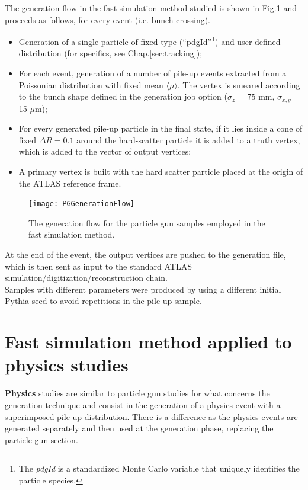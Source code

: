\documentclass[a4paper,twoside,12pt]{book}
\begin{document}
The generation flow in the fast simulation method studied is shown in Fig.\ref{fig:PGGenerationFlow} and proceeds as follows,
for every event (i.e. bunch-crossing).\\
\begin{itemize}
\item Generation of a single particle of fixed type (``pdgId''\footnote{The \textit{pdgId} 
is a standardized Monte Carlo variable that uniquely identifies the particle species.}) and 
user-defined distribution (for specifics, see Chap.\ref{sec:tracking});
\item For each event, generation of a number of pile-up events extracted from a Poissonian
distribution with fixed mean $\langle\mu\rangle$. The vertex is smeared according to the bunch shape
defined in the generation job option ($\sigma_{z}$ = 75 mm, $\sigma_{x,y}$ = 15 $\mu$m);
\item For every generated pile-up particle in the final state, if it lies inside a cone of fixed
$\Delta R = 0.1$ around the hard-scatter particle it is added to a truth vertex, which is added to the vector of output vertices;
\item A primary vertex is built with the hard scatter particle placed at the origin of the
ATLAS reference frame.
\end{itemize}

\begin{figure} [h]
	\texttt{[image: PGGenerationFlow]}
	\caption{The generation flow for the particle gun samples employed in the fast 
	simulation method. }
	\label{fig:PGGenerationFlow}
\end{figure}

At the end of the event, the output vertices are pushed to the generation file, which is then
sent as input to the standard ATLAS simulation/digitization/reconstruction chain.\\

Samples with different parameters were produced by using a different initial Pythia seed to 
avoid repetitions in the pile-up sample. \\

\section{Fast simulation method applied to physics studies}\label{sec:simulation:physicsSimulation}

\textbf{Physics} studies are similar to particle gun studies for what concerns the generation technique and 
consist in the generation of a physics event with a superimposed pile-up distribution. There is a difference as
the physics events are generated separately and then used at the generation phase, replacing the particle gun
section.\\
\end{document}
